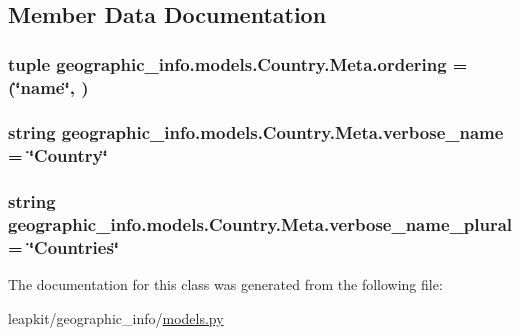\subsection{Member Data Documentation}
\hypertarget{classgeographic__info_1_1models_1_1_country_1_1_meta_a109585f8ca52106bc0221abab3d03c77}{
\subsubsection[{ordering}]{\setlength{\rightskip}{0pt plus 5cm}tuple geographic\-\_\-info.\-models.\-Country.\-Meta.\-ordering = (\char`\"{}name\char`\"{}, )\hspace{0.3cm}{\ttfamily [static]}}}\label{classgeographic__info_1_1models_1_1_country_1_1_meta_a109585f8ca52106bc0221abab3d03c77}
\hypertarget{classgeographic__info_1_1models_1_1_country_1_1_meta_a99b3792f3111ad9419f50007aa634222}{
\subsubsection[{verbose\-\_\-name}]{\setlength{\rightskip}{0pt plus 5cm}string geographic\-\_\-info.\-models.\-Country.\-Meta.\-verbose\-\_\-name = \char`\"{}Country\char`\"{}\hspace{0.3cm}{\ttfamily [static]}}}\label{classgeographic__info_1_1models_1_1_country_1_1_meta_a99b3792f3111ad9419f50007aa634222}
\hypertarget{classgeographic__info_1_1models_1_1_country_1_1_meta_a4455061c02459575254167375c62958b}{
\subsubsection[{verbose\-\_\-name\-\_\-plural}]{\setlength{\rightskip}{0pt plus 5cm}string geographic\-\_\-info.\-models.\-Country.\-Meta.\-verbose\-\_\-name\-\_\-plural = \char`\"{}Countries\char`\"{}\hspace{0.3cm}{\ttfamily [static]}}}\label{classgeographic__info_1_1models_1_1_country_1_1_meta_a4455061c02459575254167375c62958b}


The documentation for this class was generated from the following file\-:\begin{DoxyCompactItemize}
\item 
leapkit/geographic\-\_\-info/\hyperlink{geographic__info_2models_8py}{models.\-py}\end{DoxyCompactItemize}

